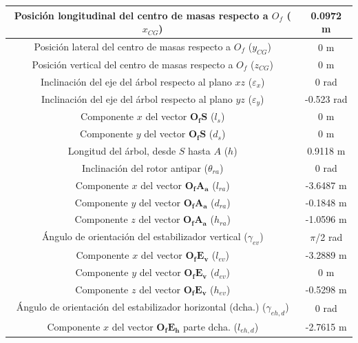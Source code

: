 \begin{table}[htbp]
	\centering
	\begin{tabular}{|>{\columncolor{Gray}}c|c|}
		\hline
		\cellcolor{Gray}Posición longitudinal del centro de masas respecto a $O_f$ ($x_{CG}$) & 0.0972 m \\ \hline
		\cellcolor{Gray}Posición lateral del centro de masas respecto a $O_f$ ($y_{CG}$) & 0 m \\ \hline
		\cellcolor{Gray}Posición vertical del centro de masas respecto a $O_f$ ($z_{CG}$) & 0 m \\ \hline
		\cellcolor{Gray}Inclinación del eje del árbol respecto al plano $xz$ ($\varepsilon_x$) & 0 rad \\ \hline
		\cellcolor{Gray}Inclinación del eje del árbol respecto al plano $yz$ ($\varepsilon_y$) & -0.523 rad \\ \hline
		\cellcolor{Gray}Componente $x$ del vector $\boldsymbol{O_fS}$ ($l_s$) & 0 m \\ \hline
		\cellcolor{Gray}Componente $y$ del vector $\boldsymbol{O_fS}$ ($d_s$) & 0 m \\ \hline
		\cellcolor{Gray}Longitud del árbol, desde $S$ hasta $A$ ($h$) & 0.9118 m \\ \hline
		\cellcolor{Gray}Inclinación del rotor antipar ($\theta_{ra}$) & 0 rad \\ \hline
		\cellcolor{Gray}Componente $x$ del vector $\boldsymbol{O_fA_a}$ ($l_{ra}$) & -3.6487 m \\ \hline
		\cellcolor{Gray}Componente $y$ del vector $\boldsymbol{O_fA_a}$ ($d_{ra}$) & -0.1848 m \\ \hline
		\cellcolor{Gray}Componente $z$ del vector $\boldsymbol{O_fA_a}$ ($h_{ra}$) & -1.0596 m \\ \hline
		\cellcolor{Gray}Ángulo de orientación del estabilizador vertical ($\gamma_{ev}$) & $\pi$/2 rad \\ \hline
		\cellcolor{Gray}Componente $x$ del vector $\boldsymbol{O_fE_v}$ ($l_{ev}$) & -3.2889 m \\ \hline
		\cellcolor{Gray}Componente $y$ del vector $\boldsymbol{O_fE_v}$ ($d_{ev}$) & 0 m \\ \hline
		\cellcolor{Gray}Componente $z$ del vector $\boldsymbol{O_fE_v}$ ($h_{ev}$) & -0.5298 m \\ \hline
		\cellcolor{Gray}Ángulo de orientación del estabilizador horizontal (dcha.) ($\gamma_{eh,d}$) & 0 rad \\ \hline
		\cellcolor{Gray}Componente $x$ del vector $\boldsymbol{O_fE_h}$ parte dcha. ($l_{eh,d}$) & -2.7615 m \\ \hline

\end{tabular}
\end{table}
